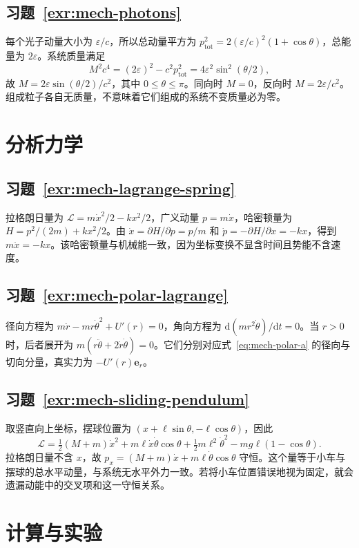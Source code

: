 \documentclass[UTF8,12pt,a4paper,fontset=fandol]{ctexbook}
\begin{document}
\subsection*{习题~\ref{exr:mech-photons}}
每个光子动量大小为 $\varepsilon/c$，所以总动量平方为 $p_{\mathrm{tot}}^2=2(\varepsilon/c)^2(1+\cos\theta)$，总能量为 $2\varepsilon$。系统质量满足
\[
 M^2c^4=(2\varepsilon)^2-c^2p_{\mathrm{tot}}^2
 =4\varepsilon^2\sin^2(\theta/2),
\]
故 $M=2\varepsilon\sin(\theta/2)/c^2$，其中 $0\le\theta\le\pi$。同向时 $M=0$，反向时 $M=2\varepsilon/c^2$。组成粒子各自无质量，不意味着它们组成的系统不变质量必为零。

\section{分析力学}
\subsection*{习题~\ref{exr:mech-lagrange-spring}}
拉格朗日量为 $\mathcal L=m\dot x^2/2-kx^2/2$，广义动量 $p=m\dot x$，哈密顿量为 $H=p^2/(2m)+kx^2/2$。由 $\dot x=\partial H/\partial p=p/m$ 和 $\dot p=-\partial H/\partial x=-kx$，得到 $m\ddot x=-kx$。该哈密顿量与机械能一致，因为坐标变换不显含时间且势能不含速度。

\subsection*{习题~\ref{exr:mech-polar-lagrange}}
径向方程为 $m\ddot r-mr\dot\theta^2+U'(r)=0$，角向方程为 $\mathrm d(mr^2\dot\theta)/\mathrm dt=0$。当 $r>0$ 时，后者展开为 $m(r\ddot\theta+2\dot r\dot\theta)=0$。它们分别对应式~\eqref{eq:mech-polar-a} 的径向与切向分量，真实力为 $-U'(r)\mathbf e_r$。

\subsection*{习题~\ref{exr:mech-sliding-pendulum}}
取竖直向上坐标，摆球位置为 $(x+\ell\sin\theta,-\ell\cos\theta)$，因此
\[
 \mathcal L=\tfrac12(M+m)\dot x^2+m\ell\dot x\dot\theta\cos\theta
 +\tfrac12m\ell^2\dot\theta^2-mg\ell(1-\cos\theta).
\]
拉格朗日量不含 $x$，故 $p_x=(M+m)\dot x+m\ell\dot\theta\cos\theta$ 守恒。这个量等于小车与摆球的总水平动量，与系统无水平外力一致。若将小车位置错误地视为固定，就会遗漏动能中的交叉项和这一守恒关系。

\section{计算与实验}
\end{document}
